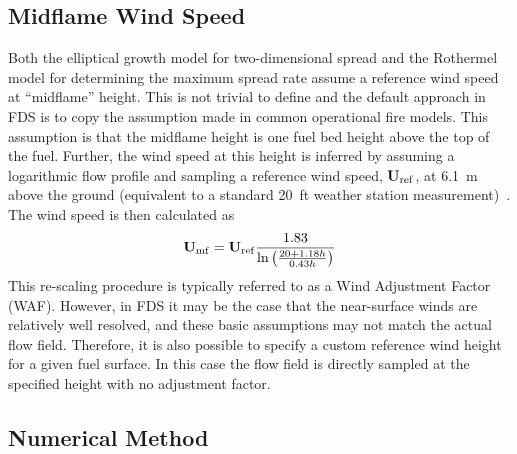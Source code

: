 \subsection{Midflame Wind Speed}

Both the elliptical growth model for two-dimensional spread and the Rothermel model for determining the maximum spread rate assume a reference wind speed at ``midflame'' height. This is not trivial to define and the default approach in FDS is to copy the assumption made in common operational fire models. This assumption is that the midflame height is one fuel bed height above the top of the fuel. Further, the wind speed at this height is inferred by assuming a logarithmic flow profile and sampling a reference wind speed, $\mathbf{U}_{\rm ref}$, at 6.1~m above the ground (equivalent to a standard 20~ft weather station measurement)~\cite{Andrews:2012}. The wind speed is then calculated as
\begin{equation}
\mathbf{U}_{\rm mf}=\mathbf{U}_{\rm ref} \frac{1.83}{\ln \left(\frac{20+1.18 h}{0.43 h}\right)}
\end{equation}
This re-scaling procedure is typically referred to as a Wind Adjustment Factor (WAF). However, in FDS it may be the case that the near-surface winds are relatively well resolved, and these basic assumptions may not match the actual flow field. Therefore, it is also possible to specify a custom reference wind height for a given fuel surface. In this case the flow field is directly sampled at the specified height with no adjustment factor.

\subsection{Numerical Method}

